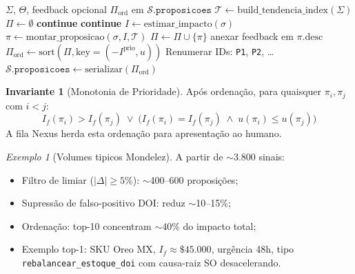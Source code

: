 \documentclass[a4paper, 12pt]{report}
\theoremstyle{definition}
\newtheorem{invariante}{Invariante}[chapter]
\theoremstyle{remark}
\newtheorem{exemplo}{Exemplo}[chapter]
\newcommand{\state}{\mathcal{S}}
\begin{document}
\begin{algorithm}[H]
\caption{Optimus -- Gera\c{c}\~ao de Proposi\c{c}\~oes}
\begin{algorithmic}[1]
  \Require $\Sigma$, $\Theta$, feedback opcional
  \Ensure $\Pi_{\text{ord}}$ em $\state.\texttt{proposicoes}$
  \State $\mathcal{T} \gets \text{build\_tendencia\_index}(\Sigma)$
  \State $\Pi \gets \emptyset$
     \textbf{continue} \EndIf
     \textbf{continue} \EndIf
    \State $I \gets \text{estimar\_impacto}(\sigma)$
    \State $\pi \gets \text{montar\_proposicao}(\sigma, I, \mathcal{T})$
      \State $\Pi \gets \Pi \cup \{\pi\}$
    \EndIf
  \EndFor
   \State anexar feedback em $\pi.\text{desc}$ \EndIf
  \State $\Pi_{\text{ord}} \gets \text{sort}(\Pi, \text{key}=(-I^{\text{prio}}, u))$
  \State Renumerar IDs: \texttt{P1}, \texttt{P2}, \ldots
  \State $\state.\texttt{proposicoes} \gets \text{serializar}(\Pi_{\text{ord}})$
\end{algorithmic}
\end{algorithm}

\begin{invariante}[Monotonia de Prioridade]
  Ap\'os ordena\c{c}\~ao, para quaisquer $\pi_i, \pi_j$ com $i < j$:
  \[
    I_f(\pi_i) > I_f(\pi_j) \;\lor\;
    \bigl(I_f(\pi_i) = I_f(\pi_j) \;\land\; u(\pi_i) \leq u(\pi_j)\bigr)
  \]
  A fila Nexus herda esta ordena\c{c}\~ao para apresenta\c{c}\~ao ao humano.
\end{invariante}

\begin{exemplo}[Volumes tipicos Mondelez]
  A partir de $\sim$3.800 sinais:
  \begin{itemize}
    \item Filtro de limiar ($|\Delta| \geq 5\%$): $\sim$400--600 proposi\c{c}\~oes;
    \item Supress\~ao de falso-positivo DOI: reduz $\sim$10--15\%;
    \item Ordena\c{c}\~ao: top-10 concentram $\sim$40\% do impacto total;
    \item Exemplo top-1: SKU Oreo MX, $I_f \approx \$45.000$, urg\^encia 48h,
      tipo \texttt{rebalancear\_estoque\_doi} com causa-raiz SO desacelerando.
  \end{itemize}
\end{exemplo}


\end{document}
